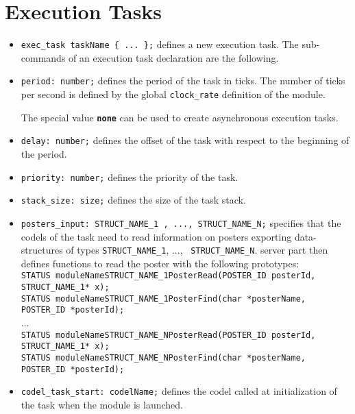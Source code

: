 \section{Execution Tasks}
\label{sec|exec-task}

\begin{itemize}
\item[]{\tt exec\_task taskName \{ ... \};} defines a new execution task. The
sub-commands of an execution task declaration are the following.

\item[]{\tt period:  number;} defines the period of the task in
ticks. The number of ticks per second is defined by the
global \texttt{clock\_rate} definition of the module.

The special value \textbf{\texttt{none}} can be used to create asynchronous
execution tasks.

\item[]{\tt delay:  number;} defines the offset of the task with respect to
the beginning of the period.

\item[]{\tt priority:  number;} defines the priority of the task.

\item[]{\tt stack\_size:  size;} defines the size of the task stack.

\item[]{\tt posters\_input:  STRUCT\_NAME\_1 , ..., STRUCT\_NAME\_N;}
specifies that the codels of the task need to read information on posters exporting
data-structures of types {\tt STRUCT\_NAME\_1}, ..., {\tt
  STRUCT\_NAME\_N}. {\GenoM} server part then defines functions to read
the poster with the following prototypes:\\ {\small
{\tt STATUS moduleNameSTRUCT\_NAME\_1PosterRead(POSTER\_ID posterId,
  STRUCT\_NAME\_1* x);}\\
{\tt STATUS moduleNameSTRUCT\_NAME\_1PosterFind(char *posterName,
  POSTER\_ID *posterId);}\\
...\\
{\tt STATUS moduleNameSTRUCT\_NAME\_NPosterRead(POSTER\_ID posterId,
  STRUCT\_NAME\_1* x);}\\
{\tt STATUS moduleNameSTRUCT\_NAME\_NPosterFind(char *posterName,
  POSTER\_ID *posterId);}\\
}

\item[]{\tt codel\_task\_start:  codelName;} defines the codel called at
initialization of the task when the module is launched.


\end{itemize}
